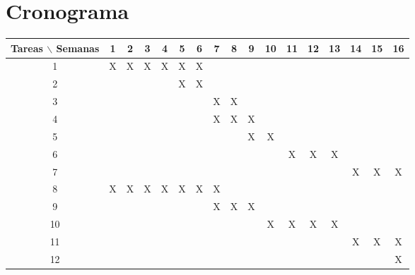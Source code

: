 \documentclass[preprint]{aastex62}
\begin{document}
  

  \section{Cronograma}

  \begin{table}[htb]
    \begin{tabular}{|c|cccccccccccccccc| }
      \hline
      Tareas $\backslash$ Semanas & 1 & 2 & 3 & 4 & 5 & 6 & 7 & 8 & 9 & 10 & 11 & 12 & 13 & 14 & 15 & 16  \\
      \hline
      1 & X & X & X & X & X & X &   &   &   &   &   &   &   &   &   &   \\
      2 &   &   &   &   & X & X &   &   &   &   &   &   &   &   &   &   \\
      3 &   &   &   &   &   &   & X & X &   &   &   &   &   &   &   &   \\
      4 &   &   &   &   &   &   & X & X & X &   &   &   &   &   &   &   \\
      5 &   &   &   &   &   &   &   &   & X & X &   &   &   &   &   &   \\
      6 &   &   &   &   &   &   &   &   &   &   & X & X & X &   &   &   \\
      7 &   &   &   &   &   &   &   &   &   &   &   &   &   & X & X & X \\
      8 & X & X & X & X & X & X & X &   &   &   &   &   &   &   &   &   \\
      9 &   &   &   &   &   &   & X & X & X &   &   &   &   &   &   &   \\
      10&   &   &   &   &   &   &   &   &   & X & X & X & X &   &   &   \\
      11&   &   &   &   &   &   &   &   &   &   &   &   &   & X & X & X \\
      12&   &   &   &   &   &   &   &   &   &   &   &   &   &   &   & X \\
      \hline
    \end{tabular}
  \end{table}
\end{document}
